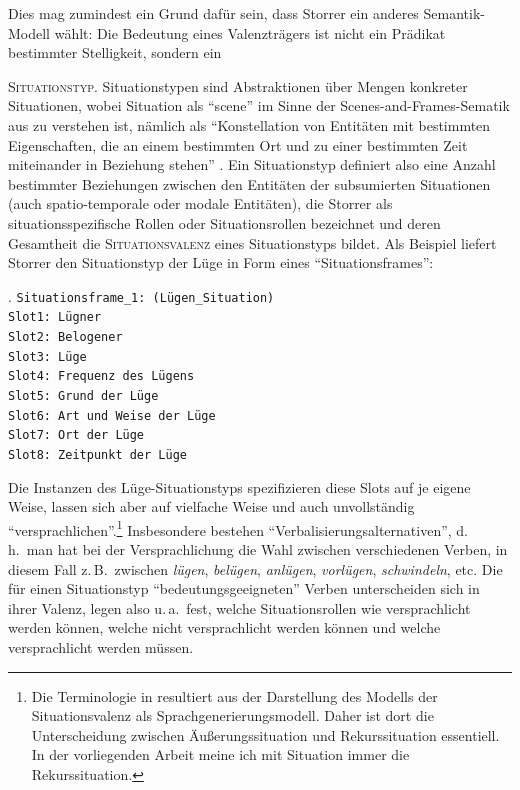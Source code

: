 Dies mag zumindest ein Grund dafür sein, dass Storrer ein anderes Semantik-Modell wählt: Die Bedeutung eines Valenzträgers ist nicht ein Prädikat bestimmter Stelligkeit, sondern ein {\textsc{Situationstyp}. Situationstypen sind Abstraktionen über Mengen konkreter Situationen, wobei Situation als "`scene"' im Sinne der Scenes-and-Frames-Sematik aus \cite{Fillmore:77,Fillmore:77b} zu verstehen ist, nämlich als "`Konstellation von Entitäten mit bestimmten Eigenschaften, die an einem bestimmten Ort und zu einer bestimmten Zeit miteinander in Beziehung stehen"' \citep[232]{Storrer:96}. Ein Situationstyp definiert also eine Anzahl bestimmter Beziehungen zwischen den Entitäten der subsumierten Situationen (auch spatio-temporale oder modale Entitäten), die Storrer als situationsspezifische Rollen oder Situationsrollen bezeichnet und deren Gesamtheit die \textsc{Situationsvalenz} eines Situationstyps bildet. Als Beispiel liefert Storrer den Situationstyp der Lüge in Form eines "`Situationsframes"': 

\ex. \label{ex-storrer-lüge} {\tt Situationsframe\_1: (Lügen\_Situation) \\[1.5ex] 
Slot1: Lügner \\
Slot2: Belogener \\
Slot3: Lüge \\
Slot4: Frequenz des Lügens \\
Slot5: Grund der Lüge \\
Slot6: Art und Weise der Lüge \\
Slot7: Ort der Lüge \\
Slot8: Zeitpunkt der Lüge \\[1.5ex]
}
\citep[286]{Storrer:92}

Die Instanzen des Lüge-Situationstyps spezifizieren diese Slots auf je eigene Weise, lassen sich aber auf vielfache Weise und auch unvollständig "`versprachlichen"'.\footnote{Die Terminologie in \cite{Storrer:92,Storrer:96} resultiert aus der Darstellung des Modells der Situationsvalenz als Sprachgenerierungsmodell. Daher ist dort die Unterscheidung zwischen Äu\ss erungssituation und Rekurssituation essentiell. In der vorliegenden Arbeit meine ich mit Situation immer die Rekurssituation.} Insbesondere bestehen "`Verbalisierungsalternativen"', d.\,h.\ man hat bei der Versprachlichung die Wahl zwischen verschiedenen Verben, in diesem Fall z.\,B.\ zwischen {\it lügen}, {\it belügen}, {\it anlügen}, {\it vorlügen}, {\it schwindeln}, etc. Die für einen Situationstyp "`bedeutungsgeeigneten"' Verben unterscheiden sich in ihrer Valenz, legen also u.\,a.\ fest, welche Situationsrollen wie versprachlicht werden können, welche nicht versprachlicht werden können und welche versprachlicht werden müssen. 

}
